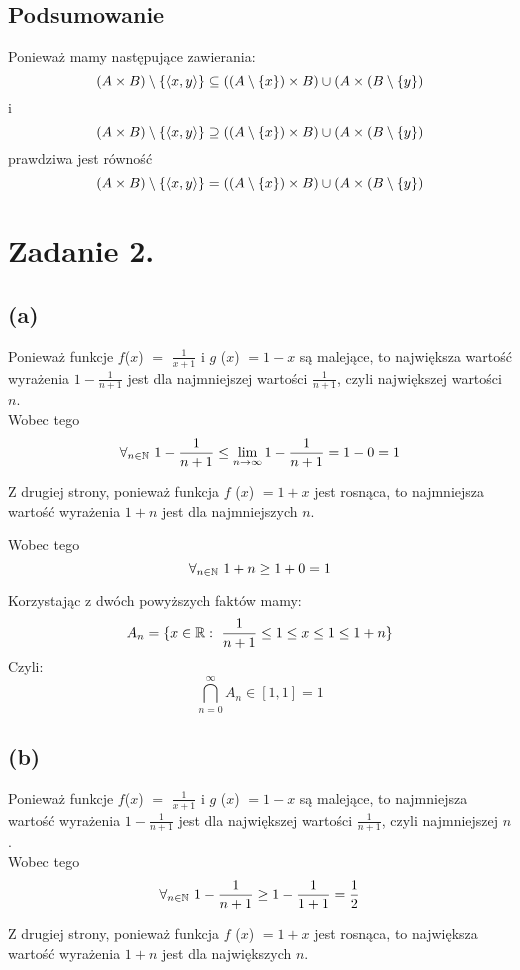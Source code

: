 \documentclass{article}
\begin{document}
\subsection*{Podsumowanie}
Ponieważ mamy następujące zawierania: \[(A \times B) \setminus \{\langle x,y\rangle\} \subseteq (( A\setminus  \{x\}) \times B) \cup (A\times (B\setminus\{y\})\] i \[(A \times B) \setminus \{\langle x,y\rangle\} \supseteq (( A\setminus  \{x\}) \times B) \cup (A\times (B\setminus\{y\})\] prawdziwa jest równość \[(A \times B) \setminus \{\langle x,y\rangle\} = (( A\setminus  \{x\}) \times B) \cup (A\times (B\setminus\{y\})\]
\blacksquare

\section*{Zadanie 2.}
\subsection*{(a)}
Ponieważ funkcje $f$($x$) $=$ $\frac{1}{x+1}$  i $g$ ($x$) $= 1-x$ są malejące, to największa wartość wyrażenia $1 - \frac{1}{n+1}$ jest dla najmniejszej wartości  $\frac{1}{n+1}$, czyli największej wartości $n$.\\


Wobec tego \[\forall_{n\in \mathbb{N}} \ 1 - \frac{1}{n+1} \leq \lim_{n\to\infty} 1 - \frac{1}{n+1} = 1 - 0 = 1\]

Z drugiej strony, ponieważ funkcja $f$ ($x$) $= 1+x$ jest rosnąca, to najmniejsza wartość wyrażenia $1+n$ jest dla najmniejszych $n$.

Wobec tego \[\forall_{n\in \mathbb{N}} \ 1+n \geq 1+0 = 1 \]

Korzystając z dwóch powyższych faktów mamy:
\[A_n = \{ x\in \mathbb{R} : \ \frac{1}{n+1} \leq 1 \leq x \leq 1 \leq 1+n\} \]
Czyli:
\[\bigcap_{n=0}^{\infty}A_n \in [1,1] = 1\]

\subsection*{(b)}

Ponieważ funkcje $f$($x$) $=$ $\frac{1}{x+1}$  i $g$ ($x$) $= 1-x$ są malejące, to najmniejsza wartość wyrażenia $1 - \frac{1}{n+1}$ jest dla największej wartości  $\frac{1}{n+1}$, czyli najmniejszej $n$.\\



Wobec tego \[\forall_{n\in \mathbb{N}} \ 1 - \frac{1}{n+1} \geq 1 - \frac{1}{1+1} = \frac{1}{2}\]

Z drugiej strony, ponieważ funkcja $f$ ($x$) $= 1+x$ jest rosnąca, to największa wartość wyrażenia $1+n$ jest dla największych $n$.
\end{document}
